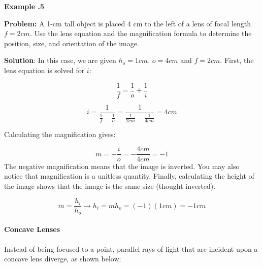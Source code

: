  \begin{mdframed}[backgroundcolor=blue!10!white]
 	\begin{center}	
 		\textbf{Example \thesection.5}	
 	\end{center}
 	
 	\textbf{Problem:} A 1-cm tall object is placed 4 cm to the left of a lens of focal length $f=2 \si{cm}$.  Use the lens equation and the magnification formula to determine the position, size, and orientation of the image.  
 	
 	\textbf{Solution}: In this case, we are given $h_o = 1 \si{cm}$, $o = 4 \si{cm}$ and $f = 2 \si{cm}$.  First, the lens equation is solved for $i$:
 	
 	\begin{equation*}
 	\frac{1}{f} = \frac{1}{o} + \frac{1}{i}  
 	\end{equation*}
 	
 	
 	\begin{equation*}
 	i = \frac{1}{\frac{1}{f}-\frac{1}{o}} = \frac{1}{\frac{1}{2\si{cm}}-\frac{1}{4\si{cm}}} = \boxed{4 \si{cm}}
 	\end{equation*}
 
 	
 	Calculating the magnification gives: 
 	
 	\begin{equation*}
 	m = - \frac{i}{o} = -\frac{4\si{cm}}{4\si{cm}} = \boxed{-1}
 	\end{equation*}
 	The negative magnification means that the image is inverted.  You may also notice that magnification is a unitless quantity.  Finally, calculating the height of the image shows that the image is the same size (thought inverted).  
 	
 	\begin{equation*}
 	m = \frac{h_i}{h_o} \longrightarrow h_i = m h_o = (-1)(1 \si{cm}) = \boxed{-1 \si{cm}}
 	\end{equation*}
 	
 	
 	
 \end{mdframed}
 


\newpage
\paragraph{Concave Lenses}  
Instead of being focused to a point, parallel rays of light that are incident upon a concave lens diverge, as shown below:

